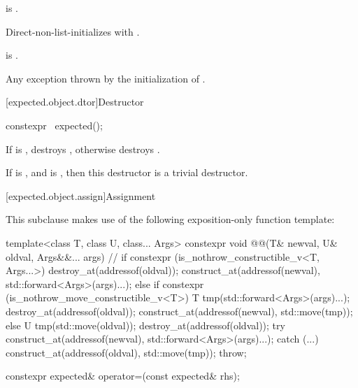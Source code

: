 \begin{itemdescr}
\pnum
\constraints
{} is .

\pnum
\effects
Direct-non-list-initializes  with
.

\pnum
\ensures
{} is .

\pnum
\throws
Any exception thrown by the initialization of .
\end{itemdescr}

[expected.object.dtor]{Destructor}

%
\begin{itemdecl}
constexpr ~expected();
\end{itemdecl}

\begin{itemdescr}
\pnum
\effects
If  is , destroys ,
otherwise destroys .

\pnum
\remarks
If  is , and
 is ,
then this destructor is a trivial destructor.
\end{itemdescr}

[expected.object.assign]{Assignment}

\pnum
This subclause makes use of the following exposition-only function template:
\begin{codeblock}
template<class T, class U, class... Args>
constexpr void @@(T& newval, U& oldval, Args&&... args) {  // \expos
  if constexpr (is_nothrow_constructible_v<T, Args...>) {
    destroy_at(addressof(oldval));
    construct_at(addressof(newval), std::forward<Args>(args)...);
  } else if constexpr (is_nothrow_move_constructible_v<T>) {
    T tmp(std::forward<Args>(args)...);
    destroy_at(addressof(oldval));
    construct_at(addressof(newval), std::move(tmp));
  } else {
    U tmp(std::move(oldval));
    destroy_at(addressof(oldval));
    try {
      construct_at(addressof(newval), std::forward<Args>(args)...);
    } catch (...) {
      construct_at(addressof(oldval), std::move(tmp));
      throw;
    }
  }
}
\end{codeblock}

%
\begin{itemdecl}
constexpr expected& operator=(const expected& rhs);
\end{itemdecl}

